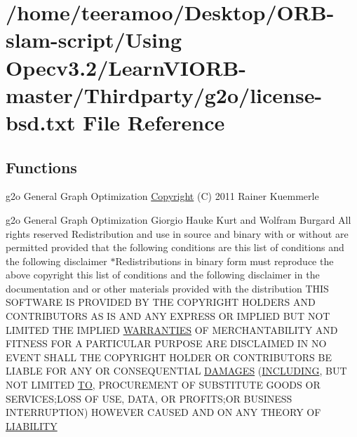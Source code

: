 \hypertarget{license-bsd_8txt}{}\section{/home/teeramoo/\+Desktop/\+O\+R\+B-\/slam-\/script/\+Using Opecv3.2/\+Learn\+V\+I\+O\+R\+B-\/master/\+Thirdparty/g2o/license-\/bsd.txt File Reference}
\label{license-bsd_8txt}
\subsection*{Functions}
\begin{DoxyCompactItemize}
\item 
g2o General Graph Optimization \hyperlink{license-bsd_8txt_a988b23b86e05792c11201cc217acf3fe}{Copyright} (C) 2011 Rainer Kuemmerle
\item 
g2o General Graph Optimization Giorgio Hauke Kurt and Wolfram Burgard All rights reserved Redistribution and use in source and binary with or without are permitted provided that the following conditions are this list of conditions and the following disclaimer $\ast$Redistributions in binary form must reproduce the above copyright this list of conditions and the following disclaimer in the documentation and or other materials provided with the distribution T\+H\+IS S\+O\+F\+T\+W\+A\+RE IS P\+R\+O\+V\+I\+D\+ED BY T\+HE C\+O\+P\+Y\+R\+I\+G\+HT H\+O\+L\+D\+E\+RS A\+ND C\+O\+N\+T\+R\+I\+B\+U\+T\+O\+RS AS IS A\+ND A\+NY E\+X\+P\+R\+E\+SS OR I\+M\+P\+L\+I\+ED B\+UT N\+OT L\+I\+M\+I\+T\+ED T\+HE I\+M\+P\+L\+I\+ED \hyperlink{license-bsd_8txt_aada97a6c44c9b8b4b0cfb3a641d0fe51}{W\+A\+R\+R\+A\+N\+T\+I\+ES} OF M\+E\+R\+C\+H\+A\+N\+T\+A\+B\+I\+L\+I\+TY A\+ND F\+I\+T\+N\+E\+SS F\+OR A P\+A\+R\+T\+I\+C\+U\+L\+AR P\+U\+R\+P\+O\+SE A\+RE D\+I\+S\+C\+L\+A\+I\+M\+ED IN NO E\+V\+E\+NT S\+H\+A\+LL T\+HE C\+O\+P\+Y\+R\+I\+G\+HT H\+O\+L\+D\+ER OR C\+O\+N\+T\+R\+I\+B\+U\+T\+O\+RS BE L\+I\+A\+B\+LE F\+OR A\+NY OR C\+O\+N\+S\+E\+Q\+U\+E\+N\+T\+I\+AL \hyperlink{license-bsd_8txt_ad6f1b88ba6644a60030679c0fbff4983}{D\+A\+M\+A\+G\+ES} (\hyperlink{license-bsd_8txt_aad5ea521b66beb52ecca7b476bdbf706}{I\+N\+C\+L\+U\+D\+I\+NG}, B\+UT N\+OT L\+I\+M\+I\+T\+ED \hyperlink{license-bsd_8txt_a3abe64e9d6972c3df3a932f316dfc926}{TO}, P\+R\+O\+C\+U\+R\+E\+M\+E\+NT OF S\+U\+B\+S\+T\+I\+T\+U\+TE G\+O\+O\+DS OR S\+E\+R\+V\+I\+C\+ES;L\+O\+SS OF U\+SE, D\+A\+TA, OR P\+R\+O\+F\+I\+TS;OR B\+U\+S\+I\+N\+E\+SS I\+N\+T\+E\+R\+R\+U\+P\+T\+I\+ON) H\+O\+W\+E\+V\+ER C\+A\+U\+S\+ED A\+ND ON A\+NY T\+H\+E\+O\+RY OF \hyperlink{license-bsd_8txt_ae0cc4cec2fa18cd51df7738e4178f88b}{L\+I\+A\+B\+I\+L\+I\+TY}

\end{DoxyCompactItemize}
